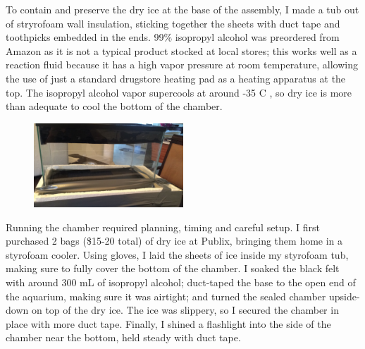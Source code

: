 \documentclass[notitlepage]{article}
\begin{document}
To contain and preserve the dry ice at the base of the assembly, I made a tub out of stryrofoam wall insulation, sticking together the sheets with duct tape and toothpicks embedded in the ends.  99\% isopropyl alcohol was preordered from Amazon as it is not a typical product stocked at local stores; this works well as a reaction fluid because it has a high vapor pressure at room temperature, allowing the use of just a standard drugstore heating pad as a heating apparatus at the top. The isopropyl alcohol vapor supercools at around -35 \degree{}C \cite{isopropanol}, so dry ice is more than adequate to cool the bottom of the chamber.


\begin{figure}
\centering
\includegraphics[width=0.5\textwidth]{assembled}
\end{figure}

Running the chamber required planning, timing and careful setup. I first purchased 2 bags (\$15-20 total) of dry ice at Publix, bringing them home in a styrofoam cooler. Using gloves, I laid the sheets of ice inside my styrofoam tub, making sure to fully cover the bottom of the chamber. I soaked the black felt with around 300 mL of isopropyl alcohol; duct-taped the base to the open end of the aquarium, making sure it was airtight; and turned the sealed chamber upside-down on top of the dry ice. The ice was slippery, so I secured the chamber in place with more duct tape. Finally, I shined a flashlight into the side of the chamber near the bottom, held steady with duct tape.
\end{document}
